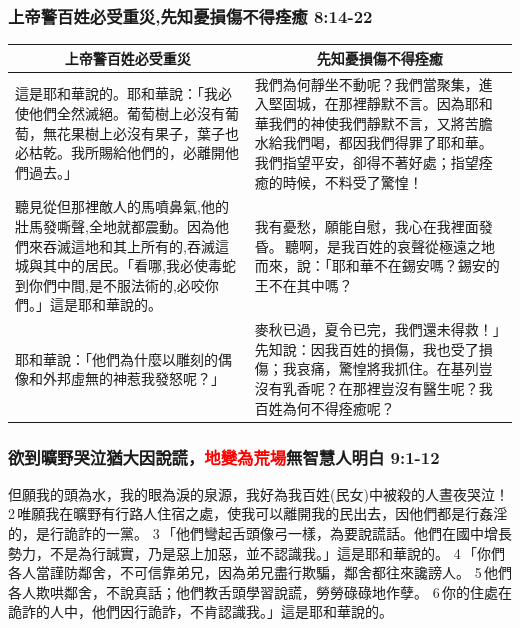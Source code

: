 \subsubsection{上帝警百姓必受重災,先知憂損傷不得痊癒 8:14-22}
\begin{table}[H]
\centering
\begin{tabular}{p{7.75cm}|p{9.50cm}}\hline\hline
\multicolumn{1}{c|}{上帝警百姓必受重災}&\multicolumn{1}{c}{先知憂損傷不得痊癒}\\\hline
這是耶和華說的。耶和華說：「我必使他們全然滅絕。葡萄樹上必沒有葡萄，無花果樹上必沒有果子，葉子也必枯乾。我所賜給他們的，必離開他們過去。」 
&我們為何靜坐不動呢？我們當聚集，進入堅固城，在那裡靜默不言。因為耶和華我們的神使我們靜默不言，又將苦膽水給我們喝，都因我們得罪了耶和華。我們指望平安，卻得不著好處；指望痊癒的時候，不料受了驚惶！\\\hline
聽見從但那裡敵人的馬噴鼻氣,他的壯馬發嘶聲,全地就都震動。因為他們來吞滅這地和其上所有的,吞滅這城與其中的居民。「看哪,我必使毒蛇到你們中間,是不服法術的,必咬你們。」這是耶和華說的。
&我有憂愁，願能自慰，我心在我裡面發昏。 聽啊，是我百姓的哀聲從極遠之地而來，說：「耶和華不在錫安嗎？錫安的王不在其中嗎？ \\\hline
耶和華說：「他們為什麼以雕刻的偶像和外邦虛無的神惹我發怒呢？」 &麥秋已過，夏令已完，我們還未得救！」先知說：因我百姓的損傷，我也受了損傷；我哀痛，驚惶將我抓住。在基列豈沒有乳香呢？在那裡豈沒有醫生呢？我百姓為何不得痊癒呢？\\\hline
\end{tabular}
\end{table}

\subsubsection{欲到曠野哭泣猶大因說謊，\textcolor{red}{地變為荒場}無智慧人明白 9:1-12}
但願我的頭為水，我的眼為淚的泉源，我好為我百姓(民女)中被殺的人晝夜哭泣！ 2 唯願我在曠野有行路人住宿之處，使我可以離開我的民出去，因他們都是行姦淫的，是行詭詐的一黨。 3 「他們彎起舌頭像弓一樣，為要說謊話。他們在國中增長勢力，不是為行誠實，乃是惡上加惡，並不認識我。」這是耶和華說的。 4 「你們各人當謹防鄰舍，不可信靠弟兄，因為弟兄盡行欺騙，鄰舍都往來讒謗人。 5 他們各人欺哄鄰舍，不說真話；他們教舌頭學習說謊，勞勞碌碌地作孽。 6 你的住處在詭詐的人中，他們因行詭詐，不肯認識我。」這是耶和華說的。

